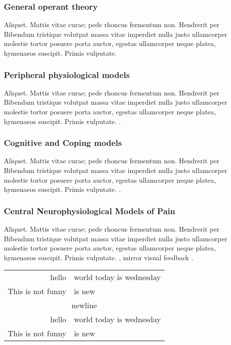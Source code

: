 		\subsubsection*{General operant theory}
		 Aliquet. Mattis vitae curae; pede rhoncus fermentum non. Hendrerit per Bibendum tristique volutpat massa vitae imperdiet nulla justo ullamcorper molestie tortor posuere porta auctor, egestas ullamcorper neque platea, hymenaeos suscipit. Primis vulputate. 

		\subsubsection*{Peripheral physiological models}
		 Aliquet. Mattis vitae curae; pede rhoncus fermentum non. Hendrerit per Bibendum tristique volutpat massa vitae imperdiet nulla justo ullamcorper molestie tortor posuere porta auctor, egestas ullamcorper neque platea, hymenaeos suscipit. Primis vulputate.  \citep{jacobson1938progressive}.



		\subsubsection*{Cognitive and Coping models}
		Aliquet. Mattis vitae curae; pede rhoncus fermentum non. Hendrerit per Bibendum tristique volutpat massa vitae imperdiet nulla justo ullamcorper molestie tortor posuere porta auctor, egestas ullamcorper neque platea, hymenaeos suscipit. Primis vulputate.  \citet{hayes:2006}.


		\subsubsection*{Central Neurophysiological Models of Pain}
		 Aliquet. Mattis vitae curae; pede rhoncus fermentum non. Hendrerit per Bibendum tristique volutpat massa vitae imperdiet nulla justo ullamcorper molestie tortor posuere porta auctor, egestas ullamcorper neque platea, hymenaeos suscipit. Primis vulputate. \citep{moseley2006graded}, mirror visual feedback \citep{mccabe2003controlled}.




		\begin{tabular}{|r  l|}
		\hline
			hello 	&	world today is wednesday\\
			This is not funny	& 	is new\\
			\hline
			\multicolumn{2}{c}{newline}\\
			\hline
			hello 	&	world today is wednesday\\
			This is not funny	& 	is new\\
		\hline

		\end{tabular}

		